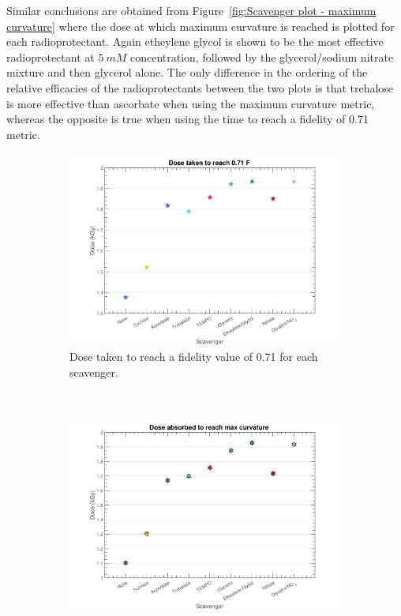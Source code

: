Similar conclusions are obtained from Figure~\ref{fig:Scavenger plot - maximum curvature} where the dose at which maximum curvature is reached is plotted for each radioprotectant. Again etheylene glycol is shown to be the most effective radioprotectant at $5\ mM$ concentration, followed by the glycerol/sodium nitrate mixture and then glycerol alone. The only difference in the ordering of the relative efficacies of the radioprotectants between the two plots is that trehalose is more effective than ascorbate when using the maximum curvature metric, whereas the opposite is true when using the time to reach a fidelity of 0.71 metric.
\begin{figure}
    \centering
    \begin{subfigure}[b]{0.8\textwidth}
            \centering
            \includegraphics[width=\textwidth]{figures/saxs/ScavengerComparisonPlot.pdf}
            \caption{Dose taken to reach a fidelity value of 0.71 for each scavenger.}
            \label{fig:Scavenger plot - arbitrary fidelity value}
    \end{subfigure}
    \\
    \begin{subfigure}[b]{0.8\textwidth}
            \centering
            \includegraphics[width=\textwidth]{figures/saxs/ScavengerCurvatureComparisonPlot.pdf}

\end{subfigure}
\end{figure}
